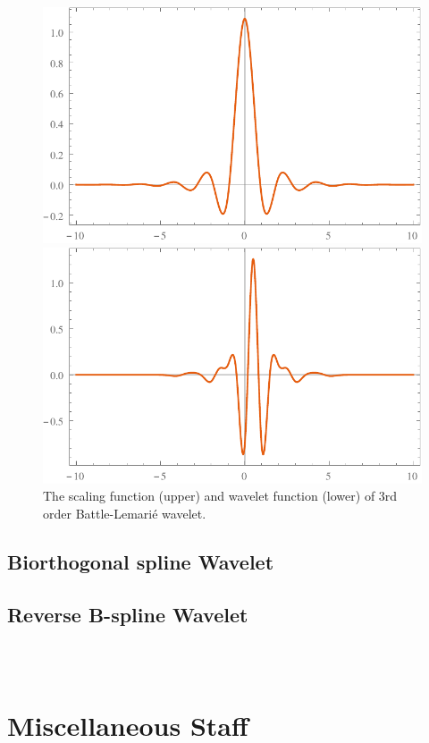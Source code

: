 \documentclass{book}
\begin{document}
\begin{figure}[h]
  \includegraphics{Figures/BL3WaveletPhi.pdf}
  
  \includegraphics{Figures/BL3WaveletPsi.pdf}
  \caption{The scaling function (upper) and wavelet function (lower) of 3rd
  order Battle-Lemari{\'e} wavelet.}
\end{figure}

\subsection{Biorthogonal spline Wavelet}

\subsection{Reverse B-spline Wavelet}

\


\[ \  \]

\section{Miscellaneous Staff}
\end{document}

